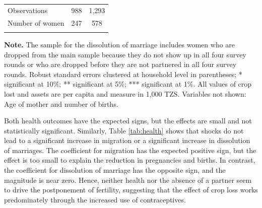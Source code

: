 \documentclass[letterpaper,12pt]{article}
\newcommand{\mco}[1]{\multicolumn{1}{c}{#1}}
\begin{document}
\begin{table}[htbp]
\begin{center}
\begin{threeparttable}
\begin{tabular}{@{} l D{.}{.}{2.6} D{.}{.}{2.6}  @{}}
Observations                                           &    \mco{988}        &  \mco{1,293}        \\
Number of women                                        &    \mco{247}        &    \mco{578}        \\
\addlinespace 
\bottomrule
\end{tabular}
\begin{tablenotes} \footnotesize
\item \hspace*{-0.5em} \textbf{Note.}
The sample for the dissolution of marriage includes women who are dropped
from the main sample because they do not show up in all four survey rounds
or who are dropped before they are not partnered in all four survey rounds.
Robust standard errors clustered at household level in parentheses; 
* significant at 10\%; ** significant at 5\%; *** significant at 1\%.
All values of crop lost and assets are per capita and measure in 1,000 TZS.
Variables not shown: Age of mother and number of births.
\end{tablenotes}
\end{threeparttable}
\end{center}
\end{table}

Both health outcomes have the expected signs, but the effects are small
and not statistically significant.
Similarly, Table \ref{tab:health} shows that shocks do not lead to a
significant increase in migration or a significant increase in dissolution of
marriages.
The coefficient for migration has the expected positive sign, but the
effect is too small to explain the reduction in pregnancies and births. 
In contrast, the coefficient for dissolution of marriage has the
opposite sign, and the magnitude is near zero. 
Hence, neither health nor the absence of a partner seem to drive the
postponement of fertility, suggesting that the effect of crop loss 
works predominately through the increased use of contraceptives.
\end{document}
